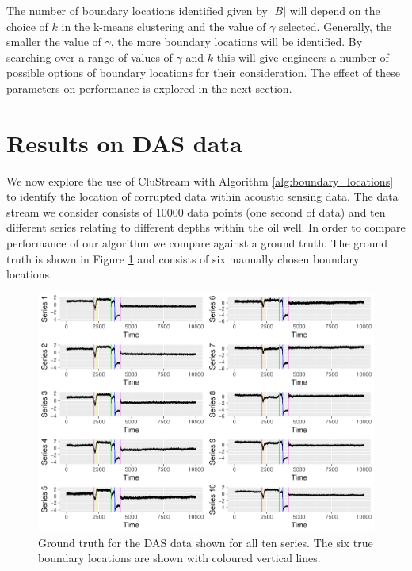 The number of boundary locations  identified  given by $|B|$  will depend on the choice of $k$ in the k-means clustering and the value of $\gamma$ selected. Generally, the smaller the value of $\gamma$, the more boundary locations will be identified. By searching over a range of values of $\gamma$ and $k$ this will give engineers a number of possible options of boundary locations for their consideration. The effect of these parameters on performance is explored in the next section. 

\newpage
\section{Results on DAS data}
\label{sec:das_analysis}

We now explore the use of CluStream with Algorithm \ref{alg:boundary_locations} to identify the location of corrupted data within acoustic sensing data. The data stream we consider consists of 10000 data points (one second of data) and ten different series relating to different depths within the oil well. In order to compare performance of our algorithm we compare against a ground truth. The ground truth is shown in Figure \ref{fig:ground_truth_das} and consists of six manually chosen boundary locations. 

\begin{figure}[H]
  \centering
  \includegraphics[width = 15cm]{ground_truth_new}
  \caption{Ground truth for the DAS data shown for all ten series. The six true boundary locations are shown with coloured vertical lines. }
  \label{fig:ground_truth_das}
\end{figure}

